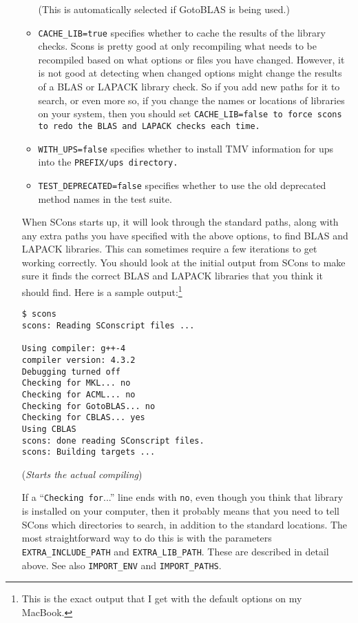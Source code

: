 \begin{enumerate}
\begin{itemize}
(This is automatically selected if GotoBLAS is being used.)
\item \texttt{CACHE\_LIB=true} specifies whether to cache the results of the library checks.  
Scons is pretty good at only recompiling what needs to be recompiled based on what options or files you have changed.  However, it is not good at detecting when changed options might change the results of a BLAS or LAPACK library check.  So if you add new paths for it to search, or even more so, if you change the names or locations of libraries on your system, then you should set \tt{CACHE\_LIB=false} to force scons to redo the BLAS and LAPACK checks each time.
\item \texttt{WITH\_UPS=false} specifies whether to install TMV information for ups into the \tt{PREFIX/ups} directory.
\item \texttt{TEST\_DEPRECATED=false} specifies whether to use the old deprecated method
names in the test suite.
\end{itemize}

When SCons starts up, it will look through the standard paths, along with any extra paths you have
specified with the above options, to find BLAS
and LAPACK libraries.  This can sometimes require a few iterations to get working correctly.  
You should look at the initial output from SCons to make sure it finds the correct BLAS
and LAPACK libraries that you think it should find.  Here is a sample output:\footnote{
This is the exact output that I get with the default options on my MacBook.}
\begin{verbatim}
$ scons
scons: Reading SConscript files ...

Using compiler: g++-4
compiler version: 4.3.2
Debugging turned off
Checking for MKL... no
Checking for ACML... no
Checking for GotoBLAS... no
Checking for CBLAS... yes
Using CBLAS
scons: done reading SConscript files.
scons: Building targets ...
\end{verbatim}
\vspace{-8pt}(\emph{Starts the actual compiling})

If a ``\texttt{Checking for}...'' line ends with \texttt{no}, even though you think that library is installed
on your computer, then it probably means that you need to tell SCons which directories
to search, in addition to the standard locations.  The most straightforward way to do this is
with the parameters \texttt{EXTRA\_INCLUDE\_PATH} and \texttt{EXTRA\_LIB\_PATH}.  
These are described in detail above.  See also \texttt{IMPORT\_ENV} and \texttt{IMPORT\_PATHS}.


\end{enumerate}
